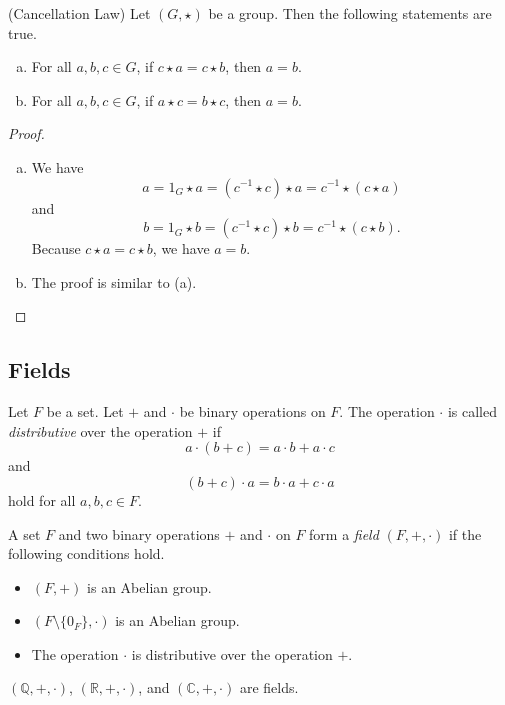 \begin{theorem}{(Cancellation Law)}
  Let $(G, \star)$ be a group. Then the following statements are true.
  \begin{enumerate}[(a)]
    \item For all $a, b, c \in G$, if $c \star a = c \star b$, then $a = b$.
    \item For all $a, b, c \in G$, if $a \star c = b \star c$, then $a = b$.
  \end{enumerate}
\end{theorem}
\begin{proof} \leavevmode
  \begin{enumerate}[(a)]
    \item We have
      $$
      a = 1_G \star a = (c^{-1} \star c) \star a = c^{-1} \star (c \star a)
      $$
      and
      $$
      b = 1_G \star b = (c^{-1} \star c) \star b = c^{-1} \star (c \star b).
      $$
      Because $c \star a = c \star b$, we have $a = b$.
    \item The proof is similar to (a). \qedhere
  \end{enumerate}
\end{proof}

\subsection{Fields}
\begin{definition}
  Let $F$ be a set. Let $+$ and $\cdot$ be binary operations on $F$.
  The operation $\cdot$ is called \emph{distributive} over the operation $+$
  if
  $$
  a \cdot (b + c) = a \cdot b + a \cdot c
  $$
  and
  $$
  (b + c) \cdot a = b \cdot a + c \cdot a
  $$
  hold for all $a, b, c \in F$.
\end{definition}

\begin{definition}
  A set $F$ and two binary operations $+$ and $\cdot$ on $F$ form a
  \emph{field} $(F, +, \cdot)$ if the following conditions hold.
  \begin{itemize}
    \item $(F, +)$ is an Abelian group.
    \item $(F \setminus \{0_F\}, \cdot)$ is an Abelian group.
    \item The operation $\cdot$ is distributive over the operation $+$.
  \end{itemize}
\end{definition}

\begin{example}
  $(\mathbb{Q}, +, \cdot)$, $(\mathbb{R}, +, \cdot)$,
  and $(\mathbb{C}, +, \cdot)$ are fields.
\end{example}

